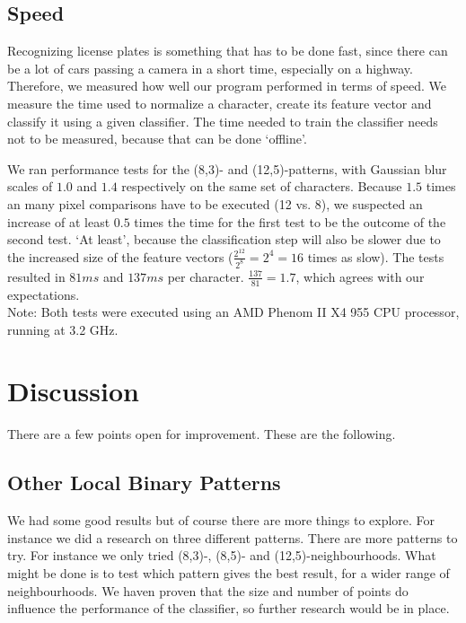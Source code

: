 \documentclass[a4paper]{article}
\begin{document}
\subsection{Speed}

Recognizing license plates is something that has to be done fast, since there
can be a lot of cars passing a camera in a short time, especially on a highway.
Therefore, we measured how well our program performed in terms of speed. We
measure the time used to normalize a character, create its feature vector and
classify it using a given classifier. The time needed to train the classifier
needs not to be measured, because that can be done `offline'.

We ran performance tests for the (8,3)- and (12,5)-patterns, with Gaussian blur
scales of $1.0$ and $1.4$ respectively on the same set of characters. Because
$1.5$ times an many pixel comparisons have to be executed (12 vs. 8), we
suspected an increase of at least $0.5$ times the time for the first test to be
the outcome of the second test. `At least', because the classification step
will also be slower due to the increased size of the feature vectors
($\frac{2^{12}}{2^8} = 2^4 = 16$ times as slow). The tests resulted in $81ms$
and $137ms$ per character. $\frac{137}{81} = 1.7$, which agrees with our
expectations. \\
Note: Both tests were executed using an AMD Phenom II X4 955 CPU processor,
running at 3.2 GHz.

\section{Discussion}

There are a few points open for improvement. These are the following.

\subsection{Other Local Binary Patterns}

We had some good results but of course there are more things to explore.
For instance we did a research on three different patterns. There are more
patterns to try. For instance we only tried (8,3)-, (8,5)- and
(12,5)-neighbourhoods. What might be done is to test which pattern gives the
best result, for a wider range of neighbourhoods. We haven proven that the size
and number of points do influence the performance of the classifier, so further
research would be in place.
\end{document}
